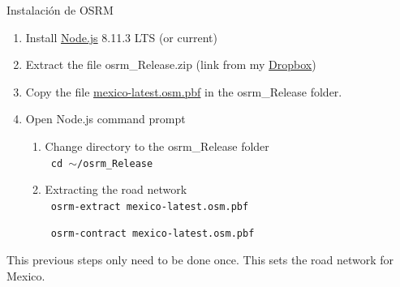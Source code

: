 \documentclass[8pt]{beamer}
\begin{document}
\appendix
\begin{frame}[label=dist]{Instalación de OSRM}

\begin{enumerate}[(1)]
    \item Install \color{blue}\href{https://nodejs.org/en/}{Node.js} \color{black} 8.11.3 LTS (or current)
    \item Extract the file osrm\_Release.zip (link from my \color{blue}\href{https://www.dropbox.com/s/eeo5f9ws7hmair4/osrm_Release.zip?dl=0}{Dropbox})
    \item \color{black} Copy the file  \color{blue}\href{https://download.geofabrik.de/north-america/mexico-latest.osm.pbf}{mexico-latest.osm.pbf} \color{black}in the osrm\_Release folder.
    \item Open Node.js command prompt
   \begin{enumerate}
        \item Change directory to the osrm\_Release folder\\
        
                \texttt{         cd $\sim$/osrm\_Release}  
                
        \item Extracting the road network\\
        
                \texttt{         osrm-extract mexico-latest.osm.pbf}
                
                \texttt{         osrm-contract mexico-latest.osm.pbf}
            
    \end{enumerate}
\end{enumerate}

This previous steps only need to be done once. This sets the road network for Mexico.

\end{frame}
\end{document}
